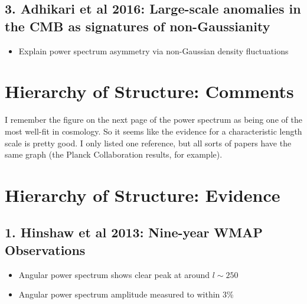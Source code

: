 \documentclass{article}
\begin{document}
\subsection*{3. Adhikari et al 2016: Large-scale anomalies in the CMB as signatures of non-Gaussianity}
\begin{itemize}
\item Explain power spectrum asymmetry via non-Gaussian density fluctuations
\end{itemize}

\newpage
\section{Hierarchy of Structure: Comments}
I remember the figure on the next page of the power spectrum as being one of the most well-fit in cosmology. So it seems like the evidence for a characteristic length scale is pretty good. I only listed one reference, but all sorts of papers have the same graph (the Planck Collaboration results, for example). 


\newpage
\section*{Hierarchy of Structure: Evidence}
\subsection*{1. Hinshaw et al 2013: Nine-year WMAP Observations}
\begin{itemize}
\item Angular power spectrum shows clear peak at around $l\sim250$
\item Angular power spectrum amplitude measured to within 3\%
\end{itemize}
\end{document}

